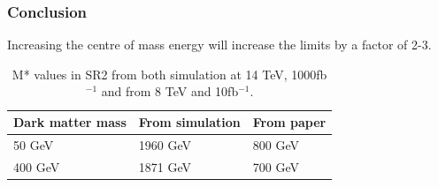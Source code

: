 \documentclass[handout]{beamer}
\begin{document}
\begin{frame}[shrink=10]\frametitle{Conclusion}
\begin{block}{}
Increasing the centre of mass energy will increase the limits by a factor of 2-3.
\end{block}


\begin{table}[ht]
\begin{center}
\begin{tabular}{|l|l|l|}
\hline
Dark matter mass & From simulation & From paper \\ \hline
50 GeV & 1960 GeV &800 GeV \\
400 GeV & 1871 GeV & 700 GeV \\ \hline
\end{tabular}
\caption{M* values in SR2 from both simulation at 14 TeV, 1000fb$^{-1}$ and from 8 TeV and 10fb$^{-1}$. }
\label{Comp pval}
\end{center}
\end{table}
\end{frame}
\end{document}
